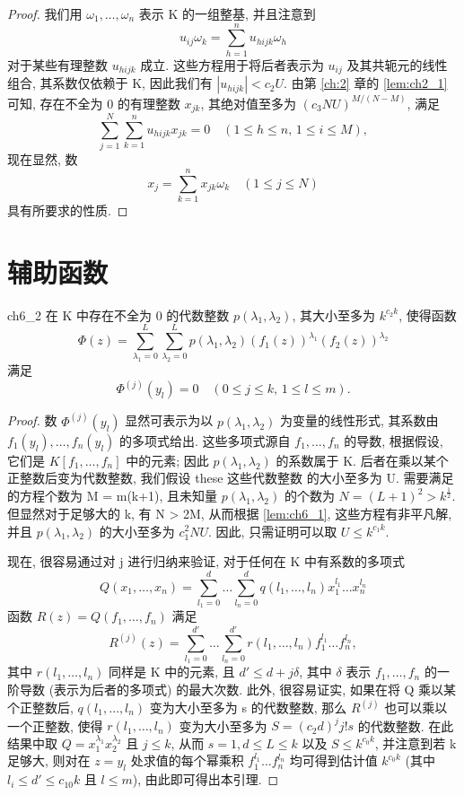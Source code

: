 \begin{proof}
我们用 $\omega_1, \dots, \omega_n$ 表示 K 的一组整基, 并且注意到
\[u_{ij}\omega_k = \sum_{h=1}^n u_{hijk}\omega_h\]
对于某些有理整数 $u_{hijk}$ 成立. 这些方程用于将后者表示为 $u_{ij}$ 及其共轭元的线性组合, 其系数仅依赖于 K, 因此我们有 $|u_{hijk}| < c_2 U$. 由第 \ref{ch:2} 章的 \autoref{lem:ch2_1} 可知, 存在不全为 0 的有理整数 $x_{jk}$, 其绝对值至多为 $(c_3 NU)^{M/(N-M)}$, 满足
\[\sum_{j=1}^{N}\sum_{k=1}^{n}u_{hijk}x_{jk}=0 \quad (1\leqslant h\leqslant n,\, 1\leqslant i\leqslant M),\]
现在显然, 数
\[x_j = \sum_{k=1}^n x_{jk} \omega_k \quad (1 \leqslant j \leqslant N)\]
具有所要求的性质.
\end{proof}

\section{辅助函数}

\begin{mylemma}{}{ch6_2}
在 K 中存在不全为 0 的代数整数 $p(\lambda_1, \lambda_2)$, 其大小至多为 $k^{c_2k}$, 使得函数
\[\Phi(z) = \sum\limits_{\lambda_1=0}^L \sum\limits_{\lambda_2=0}^L p(\lambda_1,\lambda_2) \left(f_1(z)\right)^{\lambda_1} (f_2(z))^{\lambda_2}\]
满足
\[\Phi^{(j)}(y_l)=0 \quad (0\leqslant j\leqslant k,\, 1\leqslant l\leqslant m).\]
\end{mylemma}

\begin{proof}
数 $\Phi^{(j)}(y_l)$ 显然可表示为以 $p(\lambda_1, \lambda_2)$ 为变量的线性形式, 其系数由 $f_1(y_l), \dots, f_n(y_l)$ 的多项式给出. 这些多项式源自 $f_1, \dots, f_n$ 的导数, 根据假设, 它们是 $K[f_1, \dots, f_n]$ 中的元素; 因此 $p(\lambda_1, \lambda_2)$ 的系数属于 K. 后者在乘以某个正整数后变为代数整数, 我们假设 these 这些代数整数 的大小至多为 U. 需要满足的方程个数为 M = m(k+1), 且未知量 $p(\lambda_1, \lambda_2)$ 的个数为 $N = (L+1)^2 > k^{\frac{1}{2}}$. 但显然对于足够大的 k, 有 N > 2M, 从而根据 \autoref{lem:ch6_1}, 这些方程有非平凡解, 并且 $p(\lambda_1, \lambda_2)$ 的大小至多为 $c_1^2NU$. 因此, 只需证明可以取 $U \leq k^{c_1k}$.

现在, 很容易通过对 j 进行归纳来验证, 对于任何在 K 中有系数的多项式
\[Q(x_1, \dots, x_n) = \sum_{l_1=0}^{d} \dots \sum_{l_n=0}^{d} q(l_1, \dots, l_n) x_1^{l_1} \dots x_n^{l_n}\]
函数 $R(z) = Q(f_1, \dots, f_n)$ 满足
\[R^{(j)}(z) = \sum_{l_1=0}^{d'} \dots \sum_{l_n=0}^{d'} r(l_1, \dots, l_n) f_1^{l_1} \dots f_n^{l_n},\]
其中 $r(l_1, \dots, l_n)$ 同样是 K 中的元素, 且 $d' \leq d + j\delta$, 其中 $\delta$ 表示 $f_1, \dots, f_n$ 的一阶导数 (表示为后者的多项式) 的最大次数. 此外, 很容易证实, 如果在将 Q 乘以某个正整数后, $q(l_1, \dots, l_n)$ 变为大小至多为 s 的代数整数, 那么 $R^{(j)}$ 也可以乘以一个正整数, 使得 $r(l_1, \dots, l_n)$ 变为大小至多为 $S = (c_2d)^j j! s$ 的代数整数. 在此结果中取 $Q = x_1^{\lambda_1} x_2^{\lambda_2}$ 且 $j \leq k$, 从而 $s = 1, d \leq L \leq k$ 以及 $S \leq k^{c_0 k}$, 并注意到若 k 足够大, 则对在 $z = y_l$ 处求值的每个幂乘积 $f_1^{l_1} \dots f_n^{l_n}$ 均可得到估计值 $k^{c_0 k}$ (其中 $l_i \leq d' \leq c_{10} k$ 且 $l \leq m$), 由此即可得出本引理.
\end{proof}

